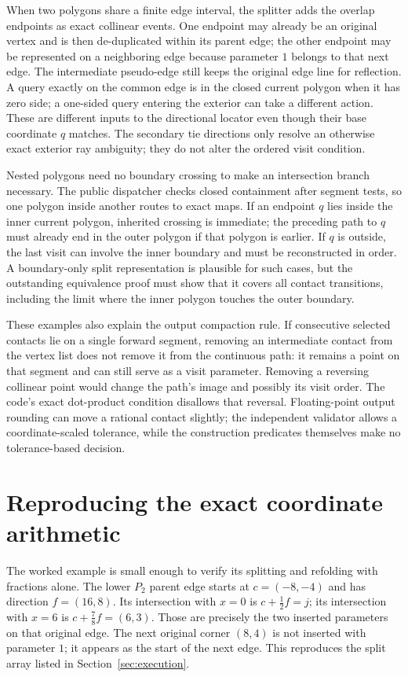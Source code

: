 \documentclass[12pt,a4paper]{article}
\begin{document}
When two polygons share a finite edge interval, the splitter adds the overlap endpoints as exact collinear events. One endpoint may already be an original vertex and is then de-duplicated within its parent edge; the other endpoint may be represented on a neighboring edge because parameter \(1\) belongs to that next edge. The intermediate pseudo-edge still keeps the original edge line for reflection. A query exactly on the common edge is in the closed current polygon when it has zero side; a one-sided query entering the exterior can take a different action. These are different inputs to the directional locator even though their base coordinate \(q\) matches. The secondary tie directions only resolve an otherwise exact exterior ray ambiguity; they do not alter the ordered visit condition.

Nested polygons need no boundary crossing to make an intersection branch necessary. The public dispatcher checks closed containment after segment tests, so one polygon inside another routes to exact maps. If an endpoint \(q\) lies inside the inner current polygon, inherited crossing is immediate; the preceding path to \(q\) must already end in the outer polygon if that polygon is earlier. If \(q\) is outside, the last visit can involve the inner boundary and must be reconstructed in order. A boundary-only split representation is plausible for such cases, but the outstanding equivalence proof must show that it covers all contact transitions, including the limit where the inner polygon touches the outer boundary.

These examples also explain the output compaction rule. If consecutive selected contacts lie on a single forward segment, removing an intermediate contact from the vertex list does not remove it from the continuous path: it remains a point on that segment and can still serve as a visit parameter. Removing a reversing collinear point would change the path's image and possibly its visit order. The code's exact dot-product condition disallows that reversal. Floating-point output rounding can move a rational contact slightly; the independent validator allows a coordinate-scaled tolerance, while the construction predicates themselves make no tolerance-based decision.

\section{Reproducing the exact coordinate arithmetic}
The worked example is small enough to verify its splitting and refolding with fractions alone. The lower \(P_2\) parent edge starts at \(c=(-8,-4)\) and has direction \(f=(16,8)\). Its intersection with \(x=0\) is \(c+\frac12f=j\); its intersection with \(x=6\) is \(c+\frac78f=(6,3)\). Those are precisely the two inserted parameters on that original edge. The next original corner \((8,4)\) is not inserted with parameter \(1\); it appears as the start of the next edge. This reproduces the split array listed in Section~\ref{sec:execution}.
\end{document}
